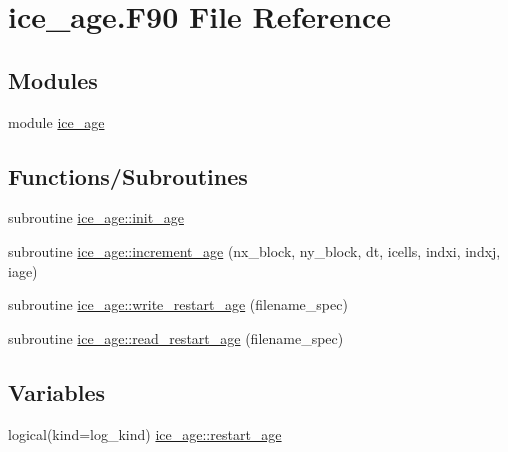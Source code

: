 \hypertarget{ice__age_8F90}{
\section{ice\_\-age.F90 File Reference}
\label{ice__age_8F90}
}
\subsection*{Modules}
\begin{DoxyCompactItemize}
\item 
module \hyperlink{namespaceice__age}{ice\_\-age}
\end{DoxyCompactItemize}
\subsection*{Functions/Subroutines}
\begin{DoxyCompactItemize}
\item 
subroutine \hyperlink{namespaceice__age_ab41cc265d5ceb720ed00b72b52f9d0e1}{ice\_\-age::init\_\-age}
\item 
subroutine \hyperlink{namespaceice__age_a13de3091a45531a0efb67a54687c35d2}{ice\_\-age::increment\_\-age} (nx\_\-block, ny\_\-block, dt, icells, indxi, indxj, iage)
\item 
subroutine \hyperlink{namespaceice__age_a6eb51bd21cc52fcd8d1985badbfca036}{ice\_\-age::write\_\-restart\_\-age} (filename\_\-spec)
\item 
subroutine \hyperlink{namespaceice__age_ab078eb2b576a145e5de96f2c9daa06c5}{ice\_\-age::read\_\-restart\_\-age} (filename\_\-spec)
\end{DoxyCompactItemize}
\subsection*{Variables}
\begin{DoxyCompactItemize}
\item 
logical(kind=log\_\-kind) \hyperlink{namespaceice__age_ad634a6462e5a115ebaa8822c16324ee9}{ice\_\-age::restart\_\-age}
\end{DoxyCompactItemize}
